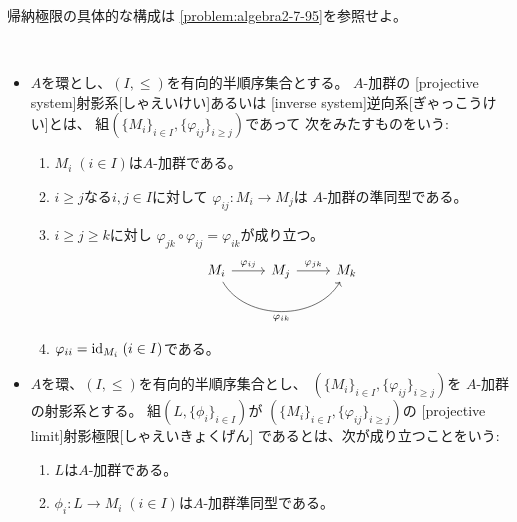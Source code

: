 \documentclass[report]{jlreq}
\begin{document}
\begin{remark}
    帰納極限の具体的な構成は
    \cref{problem:algebra2-7-95}を参照せよ。
\end{remark}

\begin{definition}[射影極限]
    ~
    \begin{itemize}
        \item $A$を環とし、$(I, \le)$を有向的半順序集合とする。
            $A$-加群の
            [projective system]{射影系}[しゃえいけい]あるいは
            [inverse system]{逆向系}[ぎゃっこうけい]とは、
            組$(\{ M_i \}_{i \in I}, \{ \varphi_{ij} \}_{i \ge j})$であって
            次をみたすものをいう:
            \begin{enumerate}
                \item $M_i \; (i \in I)$は$A$-加群である。
                \item $i \ge j$なる$i, j \in I$に対して
                    $\varphi_{ij} \colon M_i \to M_j$は
                    $A$-加群の準同型である。
                \item $i \ge j \ge k$に対し
                    $\varphi_{jk} \circ \varphi_{ij} = \varphi_{ik}$が成り立つ。
                    \begin{equation}
                        \begin{tikzcd}
                            M_i \ar{r}{\varphi_{ij}}
                                \ar[bend right=60]{rr}[swap]{\varphi_{ik}}
                                & M_j \ar{r}{\varphi_{jk}}
                                & M_k
                        \end{tikzcd}
                    \end{equation}
                \item $\varphi_{ii} = \mathrm{id}_{M_i} \; (i \in I)$である。
            \end{enumerate}
        \item $A$を環、$(I, \le)$を有向的半順序集合とし、
            $(\{ M_i \}_{i \in I}, \{ \varphi_{ij} \}_{i \ge j})$を
            $A$-加群の射影系とする。
            組$(L, \{ \phi_i \}_{i \in I})$が
            $(\{ M_i \}_{i \in I}, \{ \varphi_{ij} \}_{i \ge j})$の
            [projective limit]{射影極限}[しゃえいきょくげん]
            であるとは、次が成り立つことをいう:
            \begin{enumerate}
                \item $L$は$A$-加群である。
                \item $\phi_i \colon L \to M_i \; (i \in I)$は$A$-加群準同型である。

\end{enumerate}
\end{itemize}
\end{definition}
\end{document}
